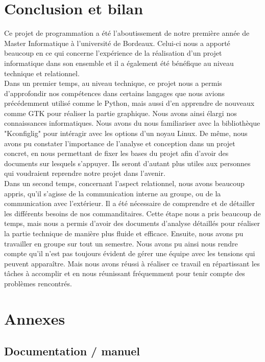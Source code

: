 \documentclass[16pts]{report}
\begin{document}
\chapter{Conclusion et bilan}
\label{cha:Conclusion et bilan}
Ce projet de programmation a été l'aboutissement de notre première année de
Master Informatique à l'université de Bordeaux. Celui-ci nous a apporté
beaucoup en ce qui concerne l'expérience de la réalisation d'un projet
informatique dans son ensemble et il a également été bénéfique au niveau
technique et relationnel.\\

Dans un premier temps, au niveau technique, ce projet nous a permis
d'approfondir nos compétences dans certains langages que nous avions
précédemment utilisé comme le Python, mais aussi d'en apprendre de nouveaux
comme GTK pour réaliser la partie graphique. Nous avons ainsi élargi nos
connaissances informatiques. Nous avons du nous familiariser avec la
bibliothèque "Kconfiglig" pour intéragir avec les options d'un noyau Linux. De
même, nous avons pu constater l'importance de l'analyse et conception dans un
projet concret, en nous permettant de fixer les bases du projet afin d'avoir
des documents sur lesquels s'appuyer. Ils seront d'autant plus utiles aux
personnes qui voudraient reprendre notre projet dans l'avenir.\\

Dans un second temps, concernant l'aspect relationnel, nous avons beaucoup
appris, qu'il s'agisse de la communication interne au groupe, ou de la
communication avec l'extérieur. Il a été nécessaire de comprendre et de
détailler les différents besoins de nos commanditaires. Cette étape nous a pris
beaucoup de temps, mais nous a permis d'avoir des documents d'analyse détaillés
pour réaliser la partie technique de manière plus fluide et efficace.  Ensuite,
nous avons pu travailler en groupe sur tout un semestre. Nous avons pu ainsi
nous rendre compte qu'il n'est pas toujours évident de gérer une équipe avec
les tensions qui peuvent apparaître. Mais nous avons réussi à réaliser ce
travail en répartissant les tâches à accomplir et en nous réunissant
fréquemment pour tenir compte des problèmes rencontrés.\\


\chapter{Annexes}
\label{cha:Annexes}
    \section{Documentation / manuel}
    \label{sec:Documentation / manuel}


\end{document}

